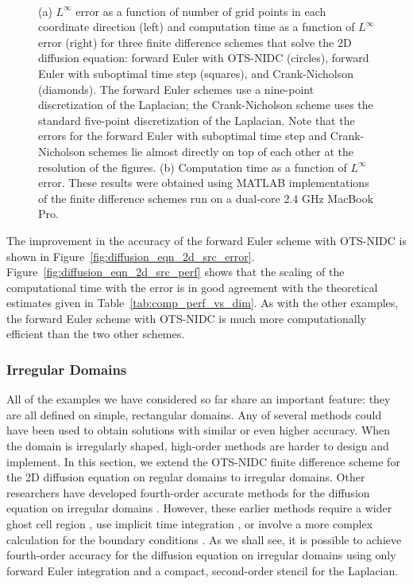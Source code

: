 \documentclass[fleqn,12pt,twoside]{article}
\begin{document}
\begin{figure}[tb]
\begin{center}
\ \ \ \ \ \ \ 
\caption{(a) $L^\infty$ error as a function of number of grid points in
each coordinate direction (left) and computation time as a function of 
$L^\infty$ error (right) for three finite difference schemes that solve the 
2D diffusion equation:
forward Euler with OTS-NIDC (circles), forward 
Euler with suboptimal time step (squares), and Crank-Nicholson (diamonds).  
The forward Euler schemes use a nine-point discretization of the Laplacian;
the Crank-Nicholson scheme uses the standard five-point discretization of
the Laplacian.  
Note that the errors for the forward Euler with suboptimal time step and 
Crank-Nicholson schemes lie almost directly on top of each other at the 
resolution of the figures.  
(b) Computation time as a function of $L^\infty$ error.  These results were
obtained using MATLAB implementations of the finite difference schemes run on
a dual-core 2.4 GHz MacBook Pro.
}
\end{center}
\end{figure}
The improvement in the accuracy of the forward Euler scheme with OTS-NIDC
is shown in Figure~\ref{fig:diffusion_eqn_2d_src_error}.
Figure~\ref{fig:diffusion_eqn_2d_src_perf} shows that the 
scaling of the computational time with the error is in good agreement with the
theoretical estimates given in Table~\ref{tab:comp_perf_vs_dim}.  As with the
other examples, the forward Euler scheme with OTS-NIDC is much 
more computationally efficient than the two other schemes.  


\subsubsection{Irregular Domains}
All of the examples we have considered so far share an important feature: they 
are all defined on simple, rectangular domains.  Any of several methods 
could have been used to obtain solutions with similar or even higher accuracy.
When the domain is irregularly shaped, high-order methods are harder to design
and implement.  
In this section, we extend the OTS-NIDC finite difference scheme for the 2D 
diffusion equation on regular domains to irregular domains.  Other 
researchers have developed fourth-order accurate methods for the diffusion 
equation on irregular domains \cite{gibou_2005,ito_2005}.  However, these 
earlier methods require a wider ghost cell region \cite{gibou_2005}, use
implicit time integration \cite{gibou_2005,ito_2005}, or involve a more 
complex calculation for the boundary conditions \cite{ito_2005}.  As we shall 
see, it is possible to achieve fourth-order accuracy for the diffusion 
equation on irregular domains using only forward Euler integration and a 
compact, second-order stencil for the Laplacian.
\end{document}
